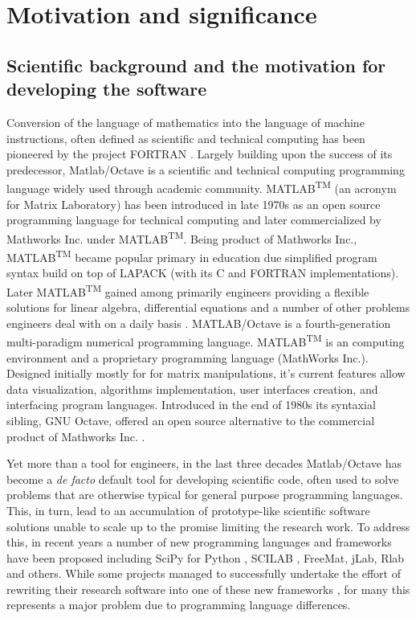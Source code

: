 \section{Motivation and significance}
\subsection{Scientific background and the motivation for developing the software}

Conversion of the language of mathematics into the language of machine instructions, often defined as scientific and technical computing has been pioneered by the project FORTRAN \cite{Backus:1957:FAC}. Largely building upon the success of its predecessor, Matlab/Octave is a scientific and technical computing programming language widely used through academic community. MATLAB\textsuperscript{TM} (an acronym for Matrix Laboratory) has been introduced in late 1970s as an open source programming language for technical computing and later commercialized by Mathworks Inc. under MATLAB\textsuperscript{TM}. Being product of Mathworks Inc., MATLAB\textsuperscript{TM} became popular primary in education due simplified program syntax build on top of LAPACK (with its C and FORTRAN implementations). Later MATLAB\textsuperscript{TM} gained among primarily engineers providing a flexible solutions for linear algebra, differential equations and a number of other problems engineers deal with on a daily basis \cite{moore2014matlab}. MATLAB/Octave is a fourth-generation multi-paradigm numerical programming language. MATLAB\textsuperscript{TM} is an computing environment and a proprietary programming language (MathWorks Inc.). Designed initially mostly for for matrix manipulations, it’s current features allow  data visualization, algorithms implementation, user interfaces creation, and interfacing program languages.  Introduced in the end of 1980s its syntaxial sibling, GNU Octave, offered an open source alternative to the commercial product of Mathworks Inc. \cite{eaton1997gnu}.

Yet more than a tool for engineers, in the last three decades Matlab/Octave has become a \textit{de facto} default tool for developing scientific code, often used to solve problems that are otherwise typical for general purpose programming languages. This, in turn, lead to an accumulation of prototype-like scientific software solutions unable to scale up to the promise limiting the research work. To address this, in recent years a number of new programming languages and frameworks have been proposed including SciPy for Python \cite{jones2001open, Olivier_2002}, SCILAB \cite{Campbell_2009}, FreeMat, jLab, Rlab and others. While some projects managed to successfully undertake the effort of rewriting their research software into one of these new frameworks \cite{17076895, 21349861}, for many this represents a major problem due to programming language differences.

